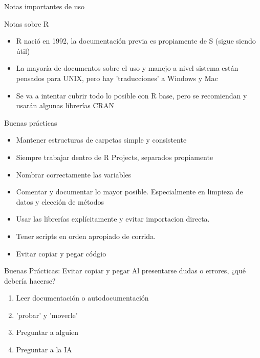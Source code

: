 \documentclass[aspectratio=169,xcolor=dvipsnames]{beamer}
\begin{document}
\begin{section}{Notas importantes de uso}  
    
\begin{frame}{Notas sobre R}
    \begin{itemize}
        \item R nació en 1992, la documentación previa es propiamente de S (sigue siendo útil)
        \item La mayoría de documentos sobre el uso y manejo a nivel sistema están pensados para UNIX, pero hay 'traducciones' a Windows y Mac
        \item Se va a intentar cubrir todo lo posible con R base, pero se recomiendan y usarán algunas librerías CRAN
    \end{itemize}
\end{frame}

\begin{frame}{Buenas prácticas}
    \begin{itemize}
        \item Mantener estructuras de carpetas simple y consistente
        \item Siempre trabajar dentro de R Projects, separados propiamente
        \item Nombrar correctamente las variables
        \item Comentar y documentar lo mayor posible. Especialmente en limpieza de datos y elección de métodos
        \item Usar las librerías explícitamente y evitar importacion directa.
        \item Tener scripts en orden apropiado de corrida.
        \item Evitar copiar y pegar códgio
    \end{itemize}
\end{frame}

\begin{frame}{Buenas Prácticas: Evitar copiar y pegar}
    Al presentarse dudas o errores, ¿qué debería hacerse?
    \begin{enumerate}
        \item Leer documentación o autodocumentación
        \item 'probar' y 'moverle'
        \item Preguntar a alguien
        \item Preguntar a la IA
    \end{enumerate}
\end{frame}
\end{section}
\end{document}
